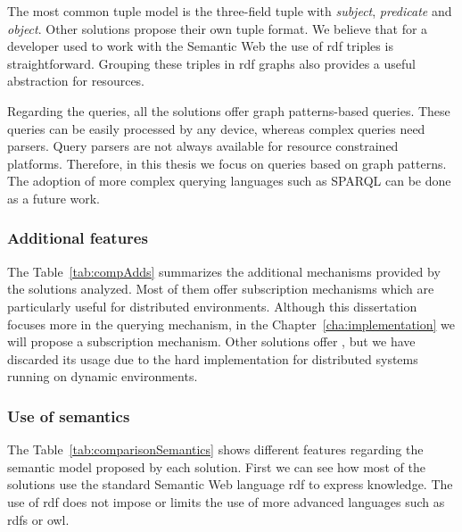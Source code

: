 The most common tuple model is the three-field tuple with \emph{subject}, \emph{predicate} and \emph{object}.
Other solutions propose their own tuple format.
We believe that for a developer used to work with the Semantic Web the use of \ac{rdf} triples is straightforward.
Grouping these triples in \ac{rdf} graphs also provides a useful abstraction for resources.

Regarding the queries, all the solutions offer graph patterns-based queries.
These queries can be easily processed by any device, whereas complex queries need parsers.
Query parsers are not always available for resource constrained platforms.
Therefore, in this thesis we focus on queries based on graph patterns.
The adoption of more complex querying languages such as SPARQL can be done as a future work. %






\subsubsection{Additional features}

The Table~\ref{tab:compAdds} summarizes the additional mechanisms provided by the solutions analyzed.
Most of them offer subscription mechanisms which are particularly useful for distributed environments.
Although this dissertation focuses more in the querying mechanism, in the Chapter~\ref{cha:implementation} we will propose a subscription mechanism.
Other solutions offer , but we have discarded its usage due to the hard implementation for distributed systems running on dynamic environments.






\subsubsection{Use of semantics}

The Table~\ref{tab:comparisonSemantics} shows different features regarding the semantic model proposed by each solution.
First we can see how most of the solutions use the standard Semantic Web language \ac{rdf} to express knowledge.
The use of \ac{rdf} does not impose or limits the use of more advanced languages such as \ac{rdfs} or \ac{owl}.


